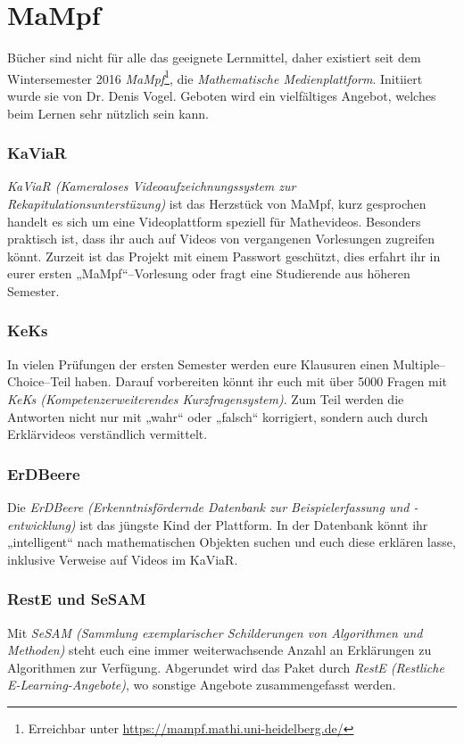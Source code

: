 \section{MaMpf}
\label{mampf}

Bücher sind nicht für alle das geeignete Lernmittel, daher existiert seit dem Wintersemester 2016 \emph{MaMpf}\footnote{Erreichbar unter \url{https://mampf.mathi.uni-heidelberg.de/}}, die \emph{Mathematische Medienplattform}. Initiiert wurde sie von Dr. Denis Vogel. Geboten wird ein vielfältiges Angebot, welches beim Lernen sehr nützlich sein kann.

\subsubsection{KaViaR}
\emph{KaViaR (Kameraloses Videoaufzeichnungssystem zur Rekapitulationsunterstüzung)} ist das Herzstück von MaMpf, kurz gesprochen handelt es sich um eine Videoplattform speziell für Mathevideos. Besonders praktisch ist, dass ihr auch auf Videos von vergangenen Vorlesungen zugreifen könnt. Zurzeit ist das Projekt mit einem Passwort geschützt, dies erfahrt ihr in eurer ersten „MaMpf“--Vorlesung oder fragt eine Studierende aus höheren Semester.

\subsubsection{KeKs}
In vielen Prüfungen der ersten Semester werden eure Klausuren einen Multiple--Choice--Teil haben. Darauf vorbereiten könnt ihr euch mit über 5000 Fragen mit \emph{KeKs (Kompetenzerweiterendes Kurzfragensystem)}. Zum Teil werden die Antworten nicht nur mit „wahr“ oder „falsch“ korrigiert, sondern auch durch Erklärvideos verständlich vermittelt.

\subsubsection{ErDBeere}
Die \emph{ErDBeere (Erkenntnisfördernde Datenbank zur Beispielerfassung und -entwicklung)} ist das jüngste Kind der Plattform. In der Datenbank könnt ihr „intelligent“ nach mathematischen Objekten suchen und euch diese erklären lasse, inklusive Verweise auf Videos im KaViaR.

\subsubsection{RestE und SeSAM}
Mit \emph{SeSAM (Sammlung exemplarischer Schilderungen von Algorithmen und Methoden)} steht euch eine immer weiterwachsende Anzahl an Erklärungen zu Algorithmen zur Verfügung. Abgerundet wird das Paket durch \emph{RestE (Restliche E-Learning-Angebote)}, wo sonstige Angebote zusammengefasst werden.
